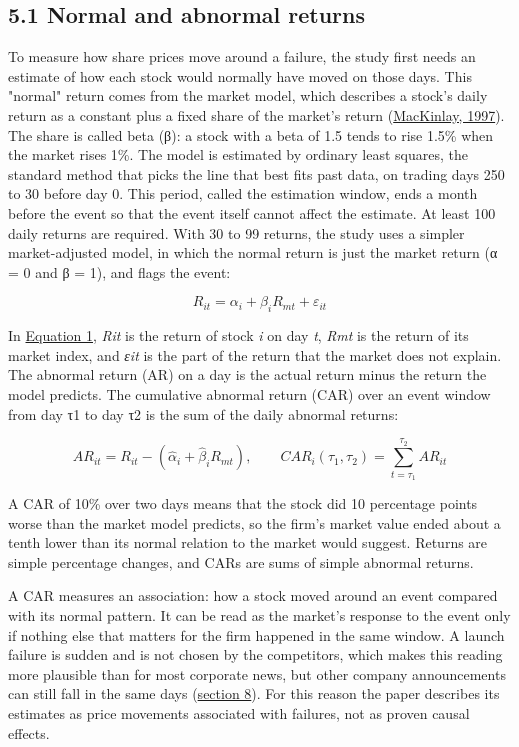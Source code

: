 \documentclass[12pt,a4paper]{article}
\begin{document}
\subsection*{5.1 Normal and abnormal returns}
To measure how share prices move around a failure, the study first needs an estimate of how each stock would normally have moved on those days. This "normal" return comes from the market model, which describes a stock's daily return as a constant plus a fixed share of the market's return (\hyperlink{ref-mackinlay1997}{MacKinlay, 1997}). The share is called beta (β): a stock with a beta of 1.5 tends to rise 1.5\% when the market rises 1\%. The model is estimated by ordinary least squares, the standard method that picks the line that best fits past data, on trading days 250 to 30 before day 0. This period, called the estimation window, ends a month before the event so that the event itself cannot affect the estimate. At least 100 daily returns are required. With 30 to 99 returns, the study uses a simpler market-adjusted model, in which the normal return is just the market return (α = 0 and β = 1), and flags the event:

\hypertarget{eq-1}{}\begin{equation}
R_{it} = \alpha_i + \beta_i R_{mt} + \varepsilon_{it}
\end{equation}

In \hyperlink{eq-1}{Equation 1}, \emph{R}\emph{it} is the return of stock \emph{i} on day \emph{t}, \emph{R}\emph{mt} is the return of its market index, and \emph{ε}\emph{it} is the part of the return that the market does not explain. The abnormal return (AR) on a day is the actual return minus the return the model predicts. The cumulative abnormal return (CAR) over an event window from day τ1 to day τ2 is the sum of the daily abnormal returns:

\hypertarget{eq-2}{}\begin{equation}
AR_{it} = R_{it} - (\hat\alpha_i + \hat\beta_i R_{mt}), \qquad CAR_i(\tau_1,\tau_2) = \sum_{t=\tau_1}^{\tau_2} AR_{it}
\end{equation}

A CAR of \textminus{}10\% over two days means that the stock did 10 percentage points worse than the market model predicts, so the firm's market value ended about a tenth lower than its normal relation to the market would suggest. Returns are simple percentage changes, and CARs are sums of simple abnormal returns.

A CAR measures an association: how a stock moved around an event compared with its normal pattern. It can be read as the market's response to the event only if nothing else that matters for the firm happened in the same window. A launch failure is sudden and is not chosen by the competitors, which makes this reading more plausible than for most corporate news, but other company announcements can still fall in the same days (\hyperlink{s8}{section 8}). For this reason the paper describes its estimates as price movements associated with failures, not as proven causal effects.
\end{document}
